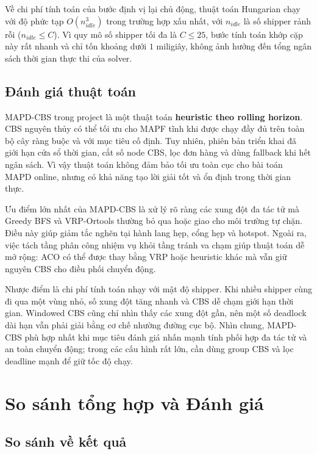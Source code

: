 \documentclass[conference]{IEEEtran}
\begin{document}
Về chi phí tính toán của bước định vị lại chủ động, thuật toán Hungarian chạy với độ phức tạp $O(n_{idle}^3)$ trong trường hợp xấu nhất, với $n_{idle}$ là số shipper rảnh rỗi ($n_{idle} \le C$). Vì quy mô số shipper tối đa là $C \le 25$, bước tính toán khớp cặp này rất nhanh và chỉ tốn khoảng dưới $1$ miligiây, không ảnh hưởng đến tổng ngân sách thời gian thực thi của solver.

\subsection{Đánh giá thuật toán}
MAPD-CBS trong project là một thuật toán \textbf{heuristic theo rolling horizon}. CBS nguyên thủy có thể tối ưu cho MAPF tĩnh khi được chạy đầy đủ trên toàn bộ cây ràng buộc và với mục tiêu cố định. Tuy nhiên, phiên bản triển khai đã giới hạn cửa sổ thời gian, cắt số node CBS, lọc đơn hàng và dùng fallback khi hết ngân sách. Vì vậy thuật toán không đảm bảo tối ưu toàn cục cho bài toán MAPD online, nhưng có khả năng tạo lời giải tốt và ổn định trong thời gian thực.

Ưu điểm lớn nhất của MAPD-CBS là xử lý rõ ràng các xung đột đa tác tử mà Greedy BFS và VRP-Ortools thường bỏ qua hoặc giao cho môi trường tự chặn. Điều này giúp giảm tắc nghẽn tại hành lang hẹp, cổng hẹp và hotspot. Ngoài ra, việc tách tầng phân công nhiệm vụ khỏi tầng tránh va chạm giúp thuật toán dễ mở rộng: ACO có thể được thay bằng VRP hoặc heuristic khác mà vẫn giữ nguyên CBS cho điều phối chuyển động.

Nhược điểm là chi phí tính toán nhạy với mật độ shipper. Khi nhiều shipper cùng đi qua một vùng nhỏ, số xung đột tăng nhanh và CBS dễ chạm giới hạn thời gian. Windowed CBS cũng chỉ nhìn thấy các xung đột gần, nên một số deadlock dài hạn vẫn phải giải bằng cơ chế nhường đường cục bộ. Nhìn chung, MAPD-CBS phù hợp nhất khi mục tiêu đánh giá nhấn mạnh tính phối hợp đa tác tử và an toàn chuyển động; trong các cấu hình rất lớn, cần dùng group CBS và lọc deadline mạnh để giữ tốc độ chạy.

\section{So sánh tổng hợp và Đánh giá}

\subsection{So sánh về kết quả}
\end{document}
